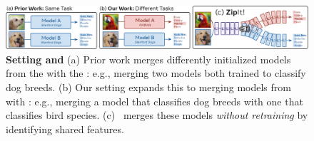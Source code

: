



    




\begin{figure}[t]
\centering
\includegraphics[width=\linewidth]{figures/imgs/concept_and_capabilities.png}
    \caption{
    {\bf Setting and \name{}} (a) Prior work merges differently initialized models from the  with the : e.g., merging two models both trained to classify dog breeds. (b) Our setting expands this to merging models from  with : e.g., merging a model that classifies dog breeds with one that classifies bird species. (c) {\bf \name{}}\ merges these models \textit{without retraining} by identifying shared features.
    }
    \label{fig:concept_and_capabilities}
\end{figure}
